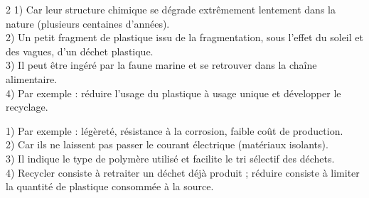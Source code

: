 \begin{multicols}{2}
1) Car leur structure chimique se dégrade extrêmement lentement dans la nature (plusieurs
centaines d'années).\\
2) Un petit fragment de plastique issu de la fragmentation, sous l'effet du soleil et des
vagues, d'un déchet plastique.\\
3) Il peut être ingéré par la faune marine et se retrouver dans la chaîne alimentaire.\\
4) Par exemple : réduire l'usage du plastique à usage unique et développer le
recyclage.

1) Par exemple : légèreté, résistance à la corrosion, faible coût de production.\\
2) Car ils ne laissent pas passer le courant électrique (matériaux isolants).\\
3) Il indique le type de polymère utilisé et facilite le tri sélectif des déchets.\\
4) Recycler consiste à retraiter un déchet déjà produit ; réduire consiste à limiter la
quantité de plastique consommée à la source.

\end{multicols}
\exercicesBanner
